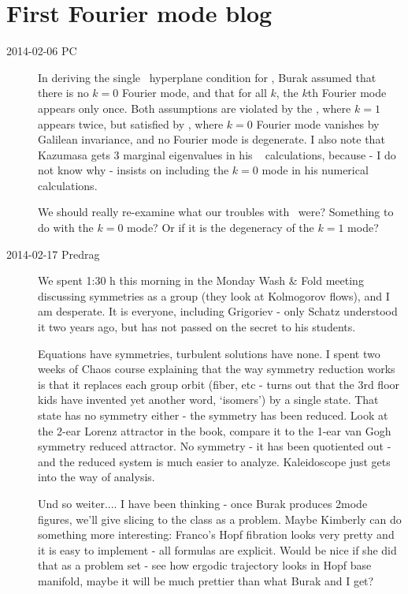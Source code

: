 
\chapter{First Fourier mode blog}
\label{c-FFmBlog}

\begin{description}

\item[2014-02-06 PC] In deriving the single \slice\ hyperplane condition
 for , Burak assumed that there is no
$k=0$ Fourier mode, and that for all $k$, the $k$th Fourier mode appears
only once. Both assumptions are violated by the \cLe, where $k=1$ appears
twice, but satisfied by \KS, where $k=0$ Fourier mode vanishes by
Galilean invariance, and no Fourier mode is degenerate. I also note that
Kazumasa gets 3 marginal eigenvalues in his \KS\ {\cLv} calculations,
because - I do not know why - insists on including the $k=0$ mode in his
numerical calculations.

We should really re-examine what our troubles with
\cLe\ were? Something to do with the $k=0$ mode? Or if it is
the degeneracy of the $k=1$ mode?


\item[2014-02-17 Predrag] We spent 1:30 h this morning in the Monday
    Wash \& Fold meeting discussing symmetries as a group (they look at
    Kolmogorov flows), and I am desperate. It is
    everyone, including Grigoriev - only Schatz understood it two years
    ago, but has not passed on the secret to his students.

Equations have symmetries, turbulent solutions have none. I spent two
weeks of Chaos course explaining that the way symmetry reduction works is that it
replaces each group orbit (fiber, etc - turns out that the 3rd floor kids
have invented yet another word, `isomers') by a single state. That state
has no symmetry either - the symmetry has been reduced. Look at the 2-ear
Lorenz attractor in the book, compare it to the 1-ear van Gogh symmetry
reduced attractor. No symmetry - it has been quotiented out - and the
reduced system is much easier to analyze. Kaleidoscope just gets into the
way of analysis.

Und so weiter.... I have been thinking - once Burak produces 2mode
figures, we'll give slicing to the class as a problem. Maybe Kimberly can do
something more interesting: Franco's Hopf fibration looks very pretty and
it is easy to implement - all formulas are explicit. Would be nice if she
did that as a problem set - see how ergodic trajectory looks in Hopf base
manifold, maybe it will be much prettier than what Burak and I get?


\end{description}
